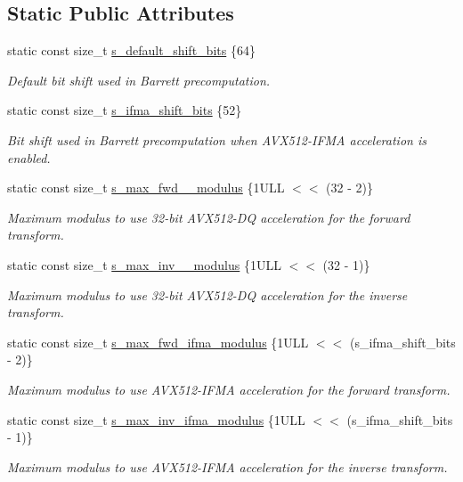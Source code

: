 \subsection*{Static Public Attributes}
\begin{DoxyCompactItemize}
\item 
static const size\+\_\+t \hyperlink{classintel_1_1hexl_1_1NTT_ab0db0e033026cff37b7acba889500b6d}{s\+\_\+default\+\_\+shift\+\_\+bits} \{64\}
\begin{DoxyCompactList}\small\item\em Default bit shift used in Barrett precomputation. \end{DoxyCompactList}\item 
static const size\+\_\+t \hyperlink{classintel_1_1hexl_1_1NTT_a5642931d7118e5a6304890f18a92c6dc}{s\+\_\+ifma\+\_\+shift\+\_\+bits} \{52\}
\begin{DoxyCompactList}\small\item\em Bit shift used in Barrett precomputation when A\+V\+X512-\/\+I\+F\+MA acceleration is enabled. \end{DoxyCompactList}\item 
static const size\+\_\+t \hyperlink{classintel_1_1hexl_1_1NTT_a4c42c952781ae97d1abf02ab5334143f}{s\+\_\+max\+\_\+fwd\+\_\+\_\+modulus} \{1\+U\+L\+L $<$$<$ (32 -\/ 2)\}
\begin{DoxyCompactList}\small\item\em Maximum modulus to use 32-\/bit A\+V\+X512-\/\+DQ acceleration for the forward transform. \end{DoxyCompactList}\item 
static const size\+\_\+t \hyperlink{classintel_1_1hexl_1_1NTT_a33af06994139ae14c69d8958611487bd}{s\+\_\+max\+\_\+inv\+\_\+\_\+modulus} \{1\+U\+L\+L $<$$<$ (32 -\/ 1)\}
\begin{DoxyCompactList}\small\item\em Maximum modulus to use 32-\/bit A\+V\+X512-\/\+DQ acceleration for the inverse transform. \end{DoxyCompactList}\item 
static const size\+\_\+t \hyperlink{classintel_1_1hexl_1_1NTT_a248f7a613b187a7f71a67b93e4ca13ad}{s\+\_\+max\+\_\+fwd\+\_\+ifma\+\_\+modulus} \{1\+U\+L\+L $<$$<$ (s\+\_\+ifma\+\_\+shift\+\_\+bits -\/ 2)\}
\begin{DoxyCompactList}\small\item\em Maximum modulus to use A\+V\+X512-\/\+I\+F\+MA acceleration for the forward transform. \end{DoxyCompactList}\item 
static const size\+\_\+t \hyperlink{classintel_1_1hexl_1_1NTT_a741db1877b630638173b6ed5f9a6e6c7}{s\+\_\+max\+\_\+inv\+\_\+ifma\+\_\+modulus} \{1\+U\+L\+L $<$$<$ (s\+\_\+ifma\+\_\+shift\+\_\+bits -\/ 1)\}
\begin{DoxyCompactList}\small\item\em Maximum modulus to use A\+V\+X512-\/\+I\+F\+MA acceleration for the inverse transform. \end{DoxyCompactList}\end{DoxyCompactItemize}



